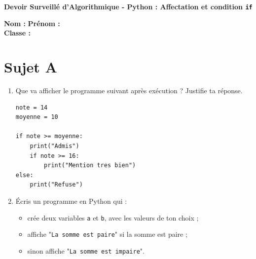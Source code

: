 \documentclass[12pt,a4paper]{article}
\begin{document}
\centering\textbf{Devoir Surveillé d’Algorithmique - Python : Affectation et condition \texttt{if}}\\
\vspace{0.5cm}

\noindent\textbf{Nom :} \underline{\hspace{5cm}} \hfill \textbf{Prénom :} \underline{\hspace{5cm}} \\
\textbf{Classe :} \underline{\hspace{5cm}}\\
\vspace{1cm}

\section*{Sujet A}

\begin{enumerate}
    \item Que va afficher le programme suivant après exécution ? Justifie ta réponse.

\begin{lstlisting}
note = 14
moyenne = 10

if note >= moyenne:
    print("Admis")
    if note >= 16:
        print("Mention tres bien")
else:
    print("Refuse")
\end{lstlisting}

\begin{tcolorbox}[colframe=black, colback=white, width=\linewidth]
\vspace{3.5cm}
\end{tcolorbox}

    \item Écris un programme en Python qui :
    \begin{itemize}
        \item crée deux variables \texttt{a} et \texttt{b}, avec les valeurs de ton choix ;
        \item affiche "\texttt{La somme est paire}" si la somme est paire ;
        \item sinon affiche "\texttt{La somme est impaire}".
    \end{itemize}

\begin{tcolorbox}[colframe=black, colback=white, width=\linewidth]
\vspace{5cm}
\end{tcolorbox}

\end{enumerate}
\end{document}
